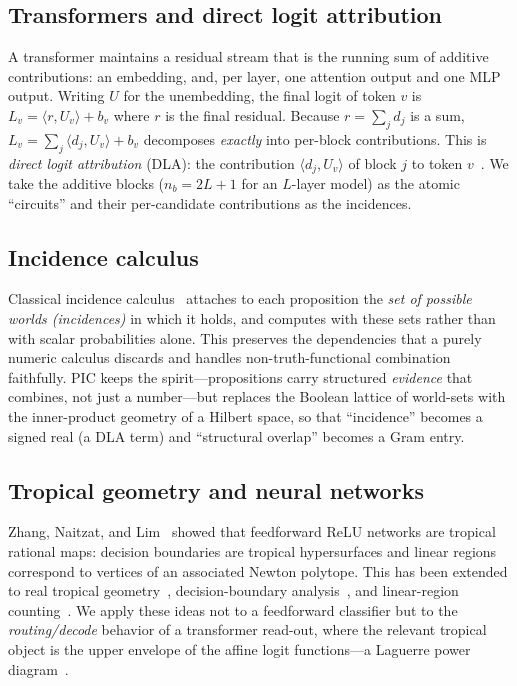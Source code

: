\documentclass[sigconf,nonacm]{acmart}
\theoremstyle{definition}
\newcommand{\inner}[2]{\langle #1, #2\rangle}
\newcommand{\Uv}{U_v}
\renewcommand{\dj}{d_j}  %
\newcommand{\nb}{n_b}
\begin{document}
\subsection{Transformers and direct logit attribution}
A transformer maintains a residual stream that is the running sum of additive
contributions: an embedding, and, per layer, one attention output and one MLP
output. Writing $U$ for the unembedding, the final logit of token $v$ is
$L_v=\inner{r}{\Uv}+b_v$ where $r$ is the final residual. Because $r=\sum_j \dj$ is
a sum, $L_v=\sum_j\inner{\dj}{\Uv}+b_v$ decomposes \emph{exactly} into per-block
contributions. This is \emph{direct logit attribution} (DLA): the contribution
$\inner{\dj}{\Uv}$ of block $j$ to token $v$~\cite{elhage2021framework,
nostalgebraist2020logitlens}. We take the additive blocks
($\nb=2L{+}1$ for an $L$-layer model) as the atomic ``circuits'' and their
per-candidate contributions as the incidences.

\subsection{Incidence calculus}
Classical incidence calculus~\cite{bundy1985incidence,liu1996incidence} attaches to
each proposition the \emph{set of possible worlds (incidences)} in which it holds,
and computes with these sets rather than with scalar probabilities alone. This
preserves the dependencies that a purely numeric calculus discards and handles
non-truth-functional combination faithfully. PIC keeps the spirit---propositions
carry structured \emph{evidence} that combines, not just a number---but replaces the
Boolean lattice of world-sets with the inner-product geometry of a Hilbert space,
so that ``incidence'' becomes a signed real (a DLA term) and ``structural overlap''
becomes a Gram entry.

\subsection{Tropical geometry and neural networks}
Zhang, Naitzat, and Lim~\cite{zhang2018tropical} showed that feedforward ReLU
networks are tropical rational maps: decision boundaries are tropical hypersurfaces
and linear regions correspond to vertices of an associated Newton polytope. This has
been extended to real tropical geometry~\cite{brandenburg2024real}, decision-boundary
analysis~\cite{alfarra2023decision}, and linear-region
counting~\cite{montufar2014regions,serra2018regions}. We apply these ideas not to a
feedforward classifier but to the \emph{routing/decode} behavior of a transformer
read-out, where the relevant tropical object is the upper envelope of the affine
logit functions---a Laguerre power diagram~\cite{maclagan2015tropical}.
\end{document}
